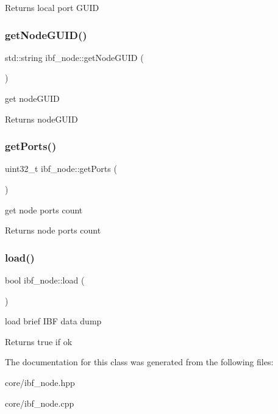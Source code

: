 \begin{DoxyReturn}{Returns}
local port G\+U\+ID 
\end{DoxyReturn}
\mbox{\label{classibf__node_afe265cfd9c0423988b063c0356058a99}} 
\subsubsection{\texorpdfstring{get\+Node\+G\+U\+I\+D()}{getNodeGUID()}}
{\footnotesize\ttfamily std\+::string ibf\+\_\+node\+::get\+Node\+G\+U\+ID (\begin{DoxyParamCaption}{ }\end{DoxyParamCaption})\hspace{0.3cm}{\ttfamily [inline]}}



get node\+G\+U\+ID 

\begin{DoxyReturn}{Returns}
node\+G\+U\+ID 
\end{DoxyReturn}
\mbox{\label{classibf__node_a82c225df0e9a802f8b146c1a7c069bdb}} 
\subsubsection{\texorpdfstring{get\+Ports()}{getPorts()}}
{\footnotesize\ttfamily uint32\+\_\+t ibf\+\_\+node\+::get\+Ports (\begin{DoxyParamCaption}{ }\end{DoxyParamCaption})\hspace{0.3cm}{\ttfamily [inline]}}



get node ports count 

\begin{DoxyReturn}{Returns}
node ports count 
\end{DoxyReturn}
\mbox{\label{classibf__node_ab9fb02d662040776f493cecc38b8d09a}} 
\subsubsection{\texorpdfstring{load()}{load()}}
{\footnotesize\ttfamily bool ibf\+\_\+node\+::load (\begin{DoxyParamCaption}{ }\end{DoxyParamCaption})}



load brief I\+BF data dump 

\begin{DoxyReturn}{Returns}
true if ok 
\end{DoxyReturn}


The documentation for this class was generated from the following files\+:\begin{DoxyCompactItemize}
\item 
core/ibf\+\_\+node.\+hpp\item 
core/ibf\+\_\+node.\+cpp\end{DoxyCompactItemize}
